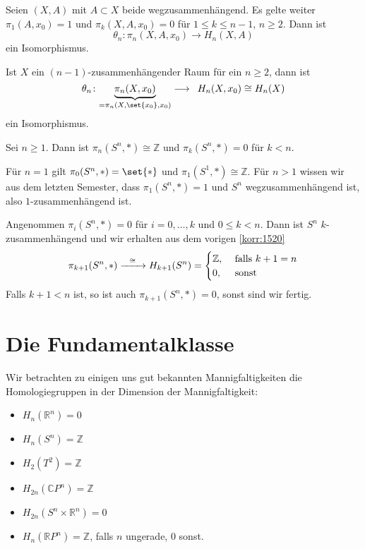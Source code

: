 \begin{satz}[{name={Hurewicz}}]
	Seien $(X,A)$ mit $A \subset X$ beide wegzusammenhängend. 
	Es gelte weiter $\pi_1(A,x_0)=1$ und $\pi_k(X,A,x_0)=0$ für $1 \le k \le n-1$, $n \ge 2$. Dann ist 
	\[
		\theta_n \colon \pi_n(X,A,x_0) \longrightarrow H_n(X,A)
	\]
	ein Isomorphismus.
\end{satz}

\begin{korollar}[{name=[{Isomorphie von Homotopie- und Homologiegruppen für $(n-1)$-zsmhg. Räume}]},label=korr:1520]
	Ist $X$ ein $(n-1)$-zusammenhängender Raum für ein $n \ge 2$, dann ist 
	\[
		\theta_n \colon \Underbrace{\pi_n(X,x_0)}{=\pi_n(X,\set{x_0},x_0)} \longrightarrow \enspace H_n(X,x_0)\cong H_n(X)
	\]
	ein Isomorphismus.
\end{korollar}

\begin{satz}[{name=[{Homotopiegruppen der Sphäre}]}]
	Sei $n \ge 1$. Dann ist $\pi_n(S^n,*)\cong \mathbb{Z}$ und $\pi_k(S^n,*)=0$ für $k <n$.
\end{satz}
\begin{beweis}
	Für $n=1$ gilt $\pi_0(S^n,*)= \set{*}$ und $\pi_1(S^1,*)\cong \mathbb{Z}$. Für $n>1$ wissen wir aus dem letzten Semester, dass $\pi_1(S^n,*)=1$ und $S^n$ wegzusammenhängend ist, also 
	$1$-zusammenhängend ist.

	Angenommen $\pi_i(S^n,*)=0$ für $i=0,\ldots ,k$ und $0 \le k < n$. Dann ist $S^n$ $k$-zusammenhängend und wir erhalten aus dem vorigen \autoref{korr:1520}
	\[
		\pi_{k+1}(S^n,*) \xrightarrow{\minwidthbox{\cong}{2em}} H_{k+1}(S^n)= \begin{cases}
			\mathbb{Z}, &\text{ falls }k+1=n\\
			0 , &\text{ sonst}
		\end{cases}
	\]
	Falls $k+1<n$ ist, so ist auch $\pi_{k+1}(S^n,*)=0$, sonst sind wir fertig.
\end{beweis}

\newpage
\section{Die Fundamentalklasse} %
\label{sec:16}

\begin{beispiel}[{name=[Homologiegruppen verschiedener Mannigfaltigkeiten]}]
	Wir betrachten zu einigen uns gut bekannten Mannigfaltigkeiten die Homologiegruppen in der Dimension der Mannigfaltigkeit:
	\begin{multicols}{2}
		\begin{itemize}
			\item $H_n(\mathbb{R}^n)=0$
			\item $H_n(S^n)=\mathbb{Z}$
			\item $H_2(T^2)=\mathbb{Z}$
			\item $H_{2n}(\mathbb{C}P^n)=\mathbb{Z}$
			\item $H_{2n}(S^n \times \mathbb{R}^n)=0$
			\item $H_n(\mathbb{R}P^n)=\mathbb{Z}$, falls $n$ ungerade, $0$ sonst.
		\end{itemize}
	\end{multicols}
\end{beispiel}

